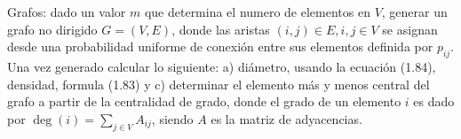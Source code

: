 \documentclass[letterpaper,11pt]{article}
\begin{document}
Grafos: dado un valor $m$ que determina el numero de elementos en $V$, generar un grafo no dirigido $G=(V,E)$, donde las aristas $(i,j)\in E, i,j\in V$ se asignan desde una probabilidad uniforme de conexión entre sus elementos definida por $p_{ij}$. Una vez generado calcular lo siguiente: a) diámetro, usando la ecuación (1.84), densidad, formula (1.83) y c) determinar el elemento más y menos central del grafo a partir de la centralidad de grado, donde el grado de un elemento $i$ es dado por $\deg(i) = \sum_{j\in V} A_{ij}$, siendo $A$ es la matriz de adyacencias.
\end{document}

